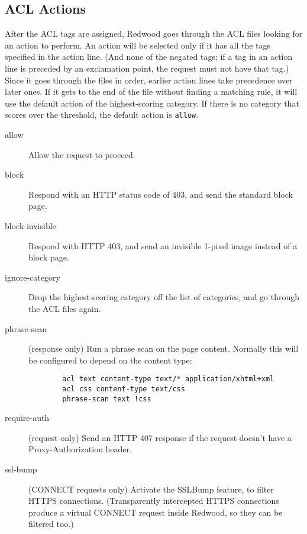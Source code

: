 \documentclass{article}
\begin{document}
\subsection{ACL Actions}

After the ACL tags are assigned, Redwood goes through the ACL files looking for an action to perform.
An action will be selected only if it has all the tags specified in the action line.
(And none of the negated tags; if a tag in an action line is preceded by an exclamation point, 
the request must not have that tag.)
Since it goes through the files in order, earlier action lines take precedence over later ones.
If it gets to the end of the file without finding a matching rule,
it will use the default action of the highest-scoring category.
If there is no category that scores over the threshold, the default action is \verb"allow".

\begin{description}

	\item[allow] Allow the request to proceed.

	\item[block] Respond with an HTTP status code of 403, and send the standard block page.

	\item[block-invisible] Respond with HTTP 403, and send an invisible 1-pixel image instead of a block page.

	\item[ignore-category] Drop the highest-scoring category off the list of categories,
		and go through the ACL files again.

	\item[phrase-scan] (response only) Run a phrase scan on the page content.
		Normally this will be configured to depend on the content type:

		\begin{verbatim}
		acl text content-type text/* application/xhtml+xml
		acl css content-type text/css
		phrase-scan text !css
		\end{verbatim}

	\item[require-auth] (request only) Send an HTTP 407 response if the request doesn't have a
		Proxy-Authorization header.

	\item[ssl-bump] (CONNECT requests only) Activate the SSLBump feature, to filter HTTPS connections.
		(Transparently intercepted HTTPS connections produce a virtual CONNECT request inside Redwood,
		so they can be filtered too.)

\end{description}
\end{document}
